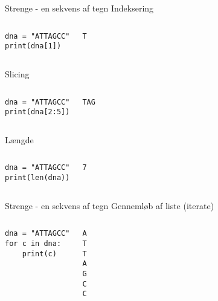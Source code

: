 \documentclass[main.tex]{subfiles}
\begin{document}
\begin{frame}[fragile]{Strenge - en sekvens af tegn}
	Indeksering
	\begin{columns}
			\begin{lstlisting}[style=python]
dna = "ATTAGCC"
print(dna[1])
			\end{lstlisting}
			\pause
			
			\begin{lstlisting}[style=python]
T
			\end{lstlisting}
			
	\end{columns}
	
	\pause
	Slicing
	\begin{columns}
		\column{0.4\textwidth}
			\begin{lstlisting}[style=python]
dna = "ATTAGCC"
print(dna[2:5])
			\end{lstlisting}
		
		\pause
		\column{0.4\textwidth}
			\begin{lstlisting}[style=python]
TAG
			\end{lstlisting}
	\end{columns}
	\pause
	Længde
	\begin{columns}
		\begin{lstlisting}[style=python]
dna = "ATTAGCC"
print(len(dna))
		\end{lstlisting}
		
		\pause
		\begin{lstlisting}[style=python]
7
		\end{lstlisting}
	\end{columns}
\end{frame}

\begin{frame}[fragile]{Strenge - en sekvens af tegn}
	Gennemløb af liste (iterate)
	\begin{columns}
		\column{0.4\textwidth}
			\begin{lstlisting}[style=python]
dna = "ATTAGCC"
for c in dna:
	print(c)
			\end{lstlisting}
			
		\pause
		\column{0.4\textwidth}
			\begin{lstlisting}[style=python]
A
T
T
A
G
C
C
			\end{lstlisting}
	\end{columns}
\end{frame}
\end{document}
